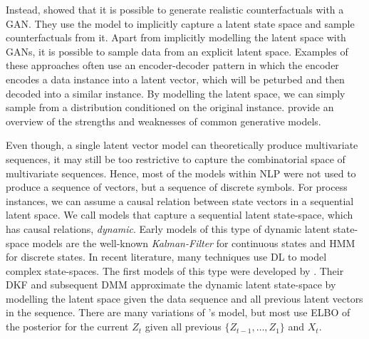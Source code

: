\documentclass[./../../paper.tex]{subfiles}
\begin{document}
Instead, \citeauthor{robeer_GeneratingRealisticNatural_2021} showed that it is possible to generate realistic counterfactuals with a \gls{GAN}\cite{robeer_GeneratingRealisticNatural_2021}. They use the model to implicitly capture a latent state space and sample counterfactuals from it. Apart from implicitly modelling the latent space with \glspl{GAN}, it is possible to sample data from an explicit latent space. Examples of these approaches often use an encoder-decoder pattern in which the encoder encodes a data instance into a latent vector, which will be peturbed and then decoded into a similar instance\cite{melnyk_ImprovedNeuralText_2017,wang_Controllableunsupervisedtext_2019}. By modelling the latent space, we can simply sample from a distribution conditioned on the original instance. \citeauthor{bond-taylor_DeepGenerativeModelling_2021} provide an overview of the strengths and weaknesses of common generative models.

Even though, a single latent vector model can theoretically produce multivariate sequences, it may still be too restrictive to capture the combinatorial space of multivariate sequences. Hence, most of the models within \gls{NLP} were not used to produce a sequence of vectors, but a sequence of discrete symbols. For process instances, we can assume a causal relation between state vectors in a sequential latent space. We call models that capture a sequential latent state-space, which has causal relations, \emph{dynamic}\cite{leglaive_RecurrentVariationalAutoencoder_2020}. Early models of this type of dynamic latent state-space models are the well-known \emph{Kalman-Filter} for continuous states and \gls{HMM} for discrete states. In recent literature, many techniques use \gls{DL} to model complex state-spaces. The first models of this type were developed by \citeauthor{krishnan_StructuredInferenceNetworks_2017}\cite{krause_InteractingPredictionsVisual_2016, krishnan_StructuredInferenceNetworks_2017}. Their \gls{DKF} and subsequent \gls{DMM} approximate the dynamic latent state-space by modelling the latent space given the data sequence and all previous latent vectors in the sequence. There are many variations\cite{chung_RecurrentLatentVariable_2016,fraccaro_Sequentialneuralmodels_2016,leglaive_RecurrentVariationalAutoencoder_2020} of \citeauthor{krishnan_StructuredInferenceNetworks_2017}'s model, but most use \gls{ELBO} of the posterior for the current $Z_{t}$ given all previous $\{Z_{t-1},\ldots,Z_{1}\}$ and $X_{t}$\cite{girin_DynamicalVariationalAutoencoders_2021}.
\end{document}
